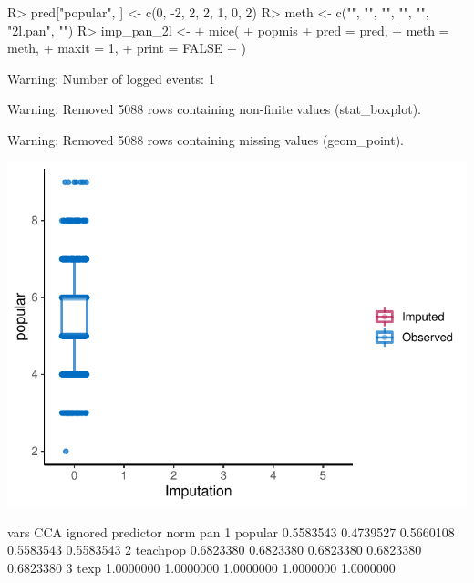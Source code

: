\documentclass[
]{jss}
\begin{document}
\begin{CodeChunk}
\begin{CodeInput}
R> pred["popular", ] <- c(0, -2, 2, 2, 1, 0, 2)
R> meth <- c("", "", "", "", "", "2l.pan", "")
R> imp_pan_2l <-
+   mice(
+     popmis %
+     pred = pred,
+     meth = meth,
+     maxit = 1,
+     print = FALSE
+   )
\end{CodeInput}
\begin{CodeOutput}
Warning: Number of logged events: 1
\end{CodeOutput}
\end{CodeChunk}

\begin{CodeChunk}
\begin{CodeOutput}
Warning: Removed 5088 rows containing non-finite values (stat_boxplot).
\end{CodeOutput}
\begin{CodeOutput}
Warning: Removed 5088 rows containing missing values (geom_point).
\end{CodeOutput}


\begin{center}\includegraphics{Manuscript_files/figure-latex/pop_pan_eval-1} \end{center}

\begin{CodeOutput}
      vars       CCA   ignored predictor      norm       pan
1  popular 0.5583543 0.4739527 0.5660108 0.5583543 0.5583543
2 teachpop 0.6823380 0.6823380 0.6823380 0.6823380 0.6823380
3     texp 1.0000000 1.0000000 1.0000000 1.0000000 1.0000000
\end{CodeOutput}
\end{CodeChunk}
\end{document}
